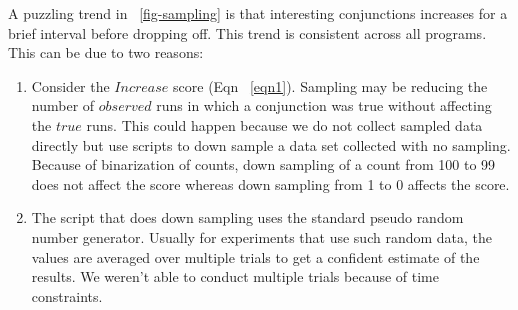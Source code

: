 A puzzling trend in ~\autoref{fig-sampling} is that interesting conjunctions increases for a brief interval before dropping off.  This trend is consistent across all programs.  This can be due to two reasons:
\begin{enumerate}
\item Consider the $Increase$ score (Eqn ~\ref{eqn1}).  Sampling may be reducing the number of $observed$ runs in which a conjunction was true without affecting the $true$ runs.  This could happen because we do not collect sampled data directly but use scripts to down sample a data set collected with no sampling.  Because of binarization of counts, down sampling of a count from 100 to 99 does not affect the score whereas down sampling from 1 to 0 affects the score. 
\item The script that does down sampling uses the standard pseudo random number generator.  Usually for experiments that use such random data, the values are averaged over multiple trials to get a confident estimate of the results.  We weren't able to conduct multiple trials because of time constraints.
\end{enumerate}

